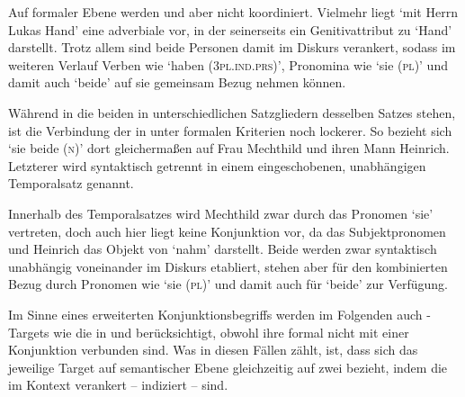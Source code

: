 Auf formaler Ebene werden  und  aber nicht
koordiniert. Vielmehr liegt  `mit
Herrn Lukas Hand' eine adverbiale  vor,
in der  seinerseits ein Genitivattribut zu 
`Hand' darstellt. Trotz allem sind beide Personen damit im Diskurs
verankert, sodass im weiteren Verlauf Verben wie 
`haben (\textsc{3pl.ind.prs})', Pronomina wie  `sie (\textsc{pl})'
und damit auch  `beide' auf sie gemeinsam Bezug nehmen können.

Während in  die beiden  in
unterschiedlichen Satzgliedern desselben Satzes stehen, ist die Verbindung der
 in  unter formalen Kriterien noch
lockerer. So bezieht sich  `sie beide (\textsc{n})' dort
gleichermaßen auf Frau Mechthild und ihren Mann Heinrich. Letzterer wird
syntaktisch getrennt in einem eingeschobenen, unabhängigen Temporalsatz
genannt.


Innerhalb des Temporalsatzes wird Mechthild zwar durch das Pronomen 
`sie' vertreten, doch auch hier liegt keine Konjunktion vor, da  das
Subjektpronomen und Heinrich das Objekt von  `nahm' darstellt. Beide
 werden zwar syntaktisch unabhängig voneinander im Diskurs
etabliert, stehen aber für den kombinierten Bezug durch Pronomen wie
 `sie (\textsc{pl})' und damit auch für 
`beide' zur Verfügung.

Im Sinne eines erweiterten Konjunktionsbegriffs werden im Folgenden auch
-Targets wie die in  und
 berücksichtigt, obwohl ihre  formal
nicht mit einer Konjunktion verbunden sind. Was in diesen Fällen zählt, ist,
dass sich das jeweilige Target auf semantischer Ebene gleichzeitig auf zwei
 bezieht, indem die  im Kontext
verankert -- indiziert -- sind.

